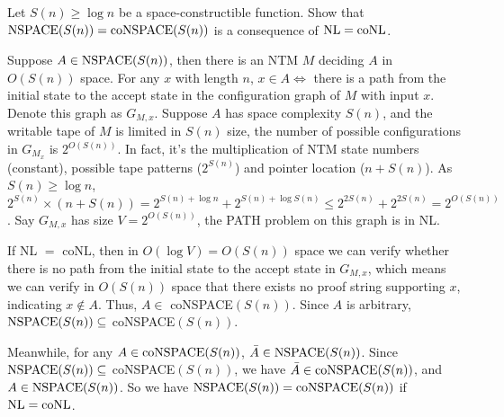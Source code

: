 \documentclass{homework}
\begin{document}
\begin{problem}
  Let $S(n) \ge \log n$ be a space-constructible function.
  Show that $\textup{NSPACE}(S(n)) = \textup{coNSPACE}(S(n))$ is a consequence of
  $\textup{NL} = \textup{coNL}$.
\end{problem}

\begin{solution}
  Suppose $A\in\textup{NSPACE}(S(n))$, then there is an NTM $M$ deciding $A$ in $O(S(n))$ space. For any $x$ with length $n$, $x\in A\iff$ there is a path from the initial state to the accept state in the configuration graph of $M$ with input $x$. Denote this graph as $G_{M,x}$. Suppose $A$ has space complexity $S(n)$, and the writable tape of $M$ is limited in $S(n)$ size, the number of possible configurations in $G_{M_x}$ is $2^{O(S(n))}$. In fact, it's the multiplication of NTM state numbers (constant), possible tape patterns ($2^{S(n)}$) and pointer location ($n+S(n)$). As $S(n)\ge\log n$, $2^{S(n)}\times(n + S(n)) = 2^{S(n)+\log n} + 2^{S(n)+\log S(n)} \le 2^{2S(n)} + 2^{2S(n)} = 2^{O(S(n))}$. Say $G_{M,x}$ has size $V=2^{O(S(n))}$, the PATH problem on this graph is in NL.

  If NL $=$ coNL, then in $O(\log V) = O(S(n))$ space we can verify whether there is no path from the initial state to the accept state in $G_{M,x}$, which means we can verify in $O(S(n))$ space that there exists no proof string supporting $x$, indicating $x\notin A$. Thus, $A\in$ coNSPACE$(S(n))$. Since $A$ is arbitrary, $\textup{NSPACE}(S(n))\subseteq$ coNSPACE$(S(n))$.

  Meanwhile, for any $A\in\textup{coNSPACE}(S(n))$, $\bar{A}\in\textup{NSPACE}(S(n))$. Since $\textup{NSPACE}(S(n))\subseteq$ coNSPACE$(S(n))$, we have $\bar{A}\in\textup{coNSPACE}(S(n))$, and $A\in \textup{NSPACE}(S(n))$. So we have $\textup{NSPACE}(S(n)) = \textup{coNSPACE}(S(n))$ if $\textup{NL} = \textup{coNL}$.
\end{solution}
\end{document}
